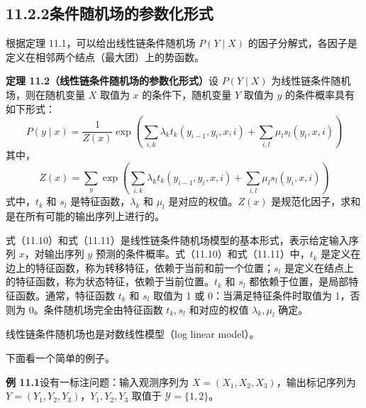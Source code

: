\documentclass[UTF8,12pt,a4paper,fontset=fandol]{ctexart}
\begin{document}
\subsection*{11.2.2\quad 条件随机场的参数化形式}

根据定理 11.1，可以给出线性链条件随机场 $P(Y\mid X)$ 的因子分解式，各因子是定义在相邻两个结点（最大团）上的势函数。

\noindent\textbf{定理 11.2（线性链条件随机场的参数化形式）}\quad 设 $P(Y\mid X)$ 为线性链条件随机场，则在随机变量 $X$ 取值为 $x$ 的条件下，随机变量 $Y$ 取值为 $y$ 的条件概率具有如下形式：
\begin{equation}
P(y\mid x)=\frac{1}{Z(x)}\exp\left(
\sum_{i,k}\lambda_k t_k(y_{i-1},y_i,x,i)+
\sum_{i,l}\mu_l s_l(y_i,x,i)
\right)
\tag{11.10}
\end{equation}
其中，
\begin{equation}
Z(x)=\sum_y\exp\left(
\sum_{i,k}\lambda_k t_k(y_{i-1},y_i,x,i)+
\sum_{i,l}\mu_l s_l(y_i,x,i)
\right)
\tag{11.11}
\end{equation}
式中，$t_k$ 和 $s_l$ 是特征函数，$\lambda_k$ 和 $\mu_l$ 是对应的权值。$Z(x)$ 是规范化因子，求和是在所有可能的输出序列上进行的。

式（11.10）和式（11.11）是线性链条件随机场模型的基本形式，表示给定输入序列 $x$，对输出序列 $y$ 预测的条件概率。式（11.10）和式（11.11）中，$t_k$ 是定义在边上的特征函数，称为转移特征，依赖于当前和前一个位置；$s_l$ 是定义在结点上的特征函数，称为状态特征，依赖于当前位置。$t_k$ 和 $s_l$ 都依赖于位置，是局部特征函数。通常，特征函数 $t_k$ 和 $s_l$ 取值为 1 或 0：当满足特征条件时取值为 1，否则为 0。条件随机场完全由特征函数 $t_k,s_l$ 和对应的权值 $\lambda_k,\mu_l$ 确定。

线性链条件随机场也是对数线性模型（log linear model）。

下面看一个简单的例子。

\noindent\textbf{例 11.1}\quad 设有一标注问题：输入观测序列为 $X=(X_1,X_2,X_3)$，输出标记序列为 $Y=(Y_1,Y_2,Y_3)$，$Y_1,Y_2,Y_3$ 取值于 $\mathcal{Y}=\{1,2\}$。
\end{document}
